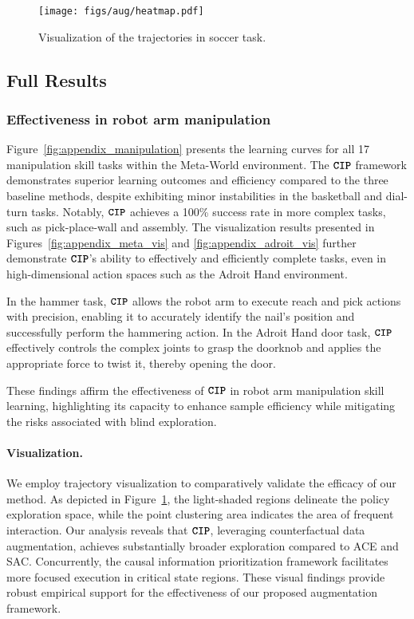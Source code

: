 \begin{figure}[h]
    \centering
    \texttt{[image: figs/aug/heatmap.pdf]}
    \caption{Visualization of the trajectories in soccer task.}
    \label{fig:aug}
    \vspace{-3mm}
\end{figure}

\subsection{Full Results}
\label{sec:full_results_appendix}

\subsubsection{Effectiveness in robot arm manipulation}
Figure~\ref{fig:appendix_manipulation} presents the learning curves for all 17 manipulation skill tasks within the Meta-World environment. The \(\texttt{\textbf{CIP}}\) framework demonstrates superior learning outcomes and efficiency compared to the three baseline methods, despite exhibiting minor instabilities in the basketball and dial-turn tasks. Notably, \(\texttt{\textbf{CIP}}\) achieves a 100\% success rate in more complex tasks, such as pick-place-wall and assembly. 
The visualization results presented in Figures~\ref{fig:appendix_meta_vis} and \ref{fig:appendix_adroit_vis} further demonstrate \(\texttt{\textbf{CIP}}\)'s ability to effectively and efficiently complete tasks, even in high-dimensional action spaces such as the Adroit Hand environment. 

In the hammer task, \(\texttt{\textbf{CIP}}\) allows the robot arm to execute reach and pick actions with precision, enabling it to accurately identify the nail's position and successfully perform the hammering action.
In the Adroit Hand door task, \(\texttt{\textbf{CIP}}\) effectively controls the complex joints to grasp the doorknob and applies the appropriate force to twist it, thereby opening the door. 

These findings affirm the effectiveness of \(\texttt{\textbf{CIP}}\) in robot arm manipulation skill learning, highlighting its capacity to enhance sample efficiency while mitigating the risks associated with blind exploration.

\vspace{-3mm}
\paragraph{Visualization.} 
We employ trajectory visualization to comparatively validate the efficacy of our method. As depicted in Figure~\ref{fig:aug}, the light-shaded regions delineate the policy exploration space, while the point clustering area indicates the area of frequent interaction. Our analysis reveals that $\texttt{\textbf{CIP}}$, leveraging counterfactual data augmentation, achieves substantially broader exploration compared to ACE and SAC. Concurrently, the causal information prioritization framework facilitates more focused execution in critical state regions. These visual findings provide robust empirical support for the effectiveness of our proposed augmentation framework. 

